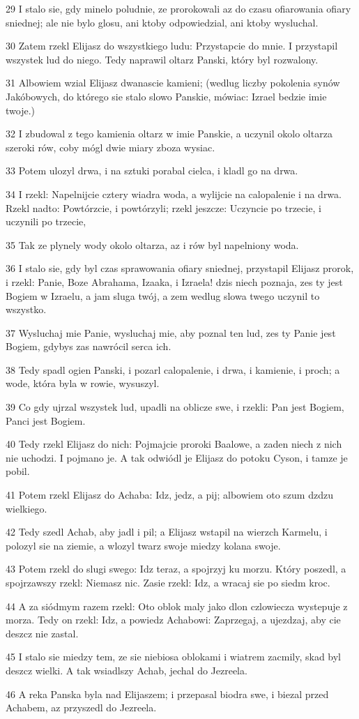 \par 29 I stalo sie, gdy minelo poludnie, ze prorokowali az do czasu ofiarowania ofiary sniednej; ale nie bylo glosu, ani ktoby odpowiedzial, ani ktoby wysluchal.
\par 30 Zatem rzekl Elijasz do wszystkiego ludu: Przystapcie do mnie. I przystapil wszystek lud do niego. Tedy naprawil oltarz Panski, który byl rozwalony.
\par 31 Albowiem wzial Elijasz dwanascie kamieni; (wedlug liczby pokolenia synów Jakóbowych, do którego sie stalo slowo Panskie, mówiac: Izrael bedzie imie twoje.)
\par 32 I zbudowal z tego kamienia oltarz w imie Panskie, a uczynil okolo oltarza szeroki rów, coby mógl dwie miary zboza wysiac.
\par 33 Potem ulozyl drwa, i na sztuki porabal cielca, i kladl go na drwa.
\par 34 I rzekl: Napelnijcie cztery wiadra woda, a wylijcie na calopalenie i na drwa. Rzekl nadto: Powtórzcie, i powtórzyli; rzekl jeszcze: Uczyncie po trzecie, i uczynili po trzecie,
\par 35 Tak ze plynely wody okolo oltarza, az i rów byl napelniony woda.
\par 36 I stalo sie, gdy byl czas sprawowania ofiary sniednej, przystapil Elijasz prorok, i rzekl: Panie, Boze Abrahama, Izaaka, i Izraela! dzis niech poznaja, zes ty jest Bogiem w Izraelu, a jam sluga twój, a zem wedlug slowa twego uczynil to wszystko.
\par 37 Wysluchaj mie Panie, wysluchaj mie, aby poznal ten lud, zes ty Panie jest Bogiem, gdybys zas nawrócil serca ich.
\par 38 Tedy spadl ogien Panski, i pozarl calopalenie, i drwa, i kamienie, i proch; a wode, która byla w rowie, wysuszyl.
\par 39 Co gdy ujrzal wszystek lud, upadli na oblicze swe, i rzekli: Pan jest Bogiem, Panci jest Bogiem.
\par 40 Tedy rzekl Elijasz do nich: Pojmajcie proroki Baalowe, a zaden niech z nich nie uchodzi. I pojmano je. A tak odwiódl je Elijasz do potoku Cyson, i tamze je pobil.
\par 41 Potem rzekl Elijasz do Achaba: Idz, jedz, a pij; albowiem oto szum dzdzu wielkiego.
\par 42 Tedy szedl Achab, aby jadl i pil; a Elijasz wstapil na wierzch Karmelu, i polozyl sie na ziemie, a wlozyl twarz swoje miedzy kolana swoje.
\par 43 Potem rzekl do slugi swego: Idz teraz, a spojrzyj ku morzu. Który poszedl, a spojrzawszy rzekl: Niemasz nic. Zasie rzekl: Idz, a wracaj sie po siedm kroc.
\par 44 A za siódmym razem rzekl: Oto oblok maly jako dlon czlowiecza wystepuje z morza. Tedy on rzekl: Idz, a powiedz Achabowi: Zaprzegaj, a ujezdzaj, aby cie deszcz nie zastal.
\par 45 I stalo sie miedzy tem, ze sie niebiosa oblokami i wiatrem zacmily, skad byl deszcz wielki. A tak wsiadlszy Achab, jechal do Jezreela.
\par 46 A reka Panska byla nad Elijaszem; i przepasal biodra swe, i biezal przed Achabem, az przyszedl do Jezreela.

